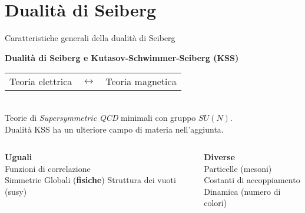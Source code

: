 \documentclass[10pt,compress,usenames,dvipsnames]{beamer}
\begin{document}
\section{Dualità di Seiberg}



\begin{frame}{Caratteristiche generali della dualità di Seiberg}
\begin{center}
 \begin{center}
 {\bfseries \Large Dualità di Seiberg e Kutasov-Schwimmer-Seiberg (KSS)} \\[0,4cm]
\end{center}
\begin{tabular}{r c l }
{ \large Teoria elettrica } & $\longleftrightarrow$ & {\large Teoria magnetica}
\end{tabular}
\\[0,2cm]

{ 
	Teorie di \textit{Supersymmetric QCD} minimali con gruppo $SU(N)$.\\
	Dualità KSS ha un ulteriore campo di materia nell'aggiunta.  
}
%
\end{center}
\begin{columns}[c]
	\begin{column}{0.5 \textwidth}			
		\begin{center}
		{\bfseries Uguali} \\
		Funzioni di correlazione \\
		Simmetrie Globali (\alert{\bfseries fisiche})
		Struttura dei vuoti (susy)
		\vspace{0,3cm}
		\end{center}
	\end{column}

	\begin{column}{0.5 \textwidth}
\vspace{-0,3cm}
		\begin{center}
		{\bfseries Diverse}\\
		Particelle (mesoni)\\
		Costanti di accoppiamento \\
		Dinamica (numero di colori)\\
		\end{center}
	\end{column}
\end{columns}
\begin{center}
\end{center}
\end{frame}
\end{document}
